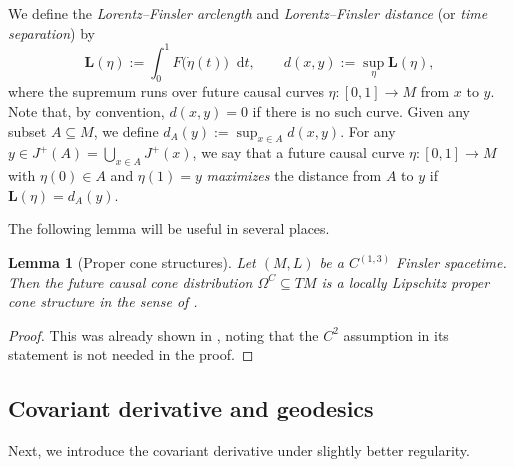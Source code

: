 \documentclass[a4paper,11pt]{article}
\numberwithin{equation}{section}
\theoremstyle{definition}
\theoremstyle{plain}
\newtheorem{Lemma}[Definition]{Lemma}
\newcommand*\diff{\mathop{}\!\mathrm{d}}
\begin{document}
We define the \emph{Lorentz--Finsler arclength} and \emph{Lorentz--Finsler distance} (or \emph{time separation}) by
\begin{equation*}
    \mathbf L(\eta):=\int_0^1 F\bigl( \dot{\eta}(t) \bigr) \diff t, \qquad d(x,y):=\sup_{\eta} \mathbf{L}(\eta),
\end{equation*}
where the supremum runs over future causal curves $\eta:[0,1] \to M$ from $x$ to $y$. 
Note that, by convention, $d(x,y) = 0$ if there is no such curve. 
Given any subset $A \subseteq M$, we define $d_A(y):=\sup_{x \in A} d(x,y)$.
For any $y \in J^+(A)=\bigcup_{x \in A}J^+(x)$, we say that a future causal curve $\eta:[0,1] \to M$ with $\eta(0) \in A$ and $\eta(1) = y$ \emph{maximizes} the distance from $A$ to $y$ if $\mathbf L(\eta) = d_A(y)$.

The following lemma will be useful in several places.

\begin{Lemma}[Proper cone structures]
\label{Lemma: lowregFinsler cone structure}
Let $(M,L)$ be a $C^{(1,3)}$ Finsler spacetime. 
Then the future causal cone distribution $\Omega^C  \subseteq TM$ is a locally Lipschitz proper cone structure in the sense of \textnormal{\cite{Minguzziconestructure}}.
\end{Lemma}

\begin{proof}
    This was already shown in \cite[Thm.\ 2.52]{Minguzziconestructure}, noting that the $C^2$ assumption in its statement is not needed in the proof.
\end{proof}


\subsection{Covariant derivative and geodesics}

Next, we introduce the covariant derivative under slightly better regularity.
\end{document}
